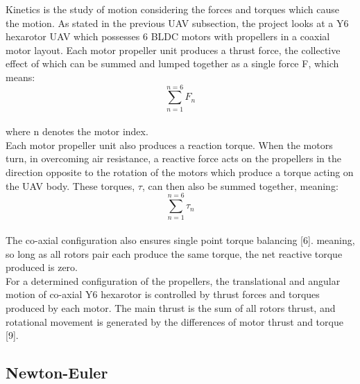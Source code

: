 \documentclass[12pt,a4paper,twoside]{report}
\begin{document}
				Kinetics is the study of motion considering the forces and torques which cause the motion. As stated in the previous UAV subsection, the project looks at a Y6 hexarotor UAV which possesses 6 BLDC motors with propellers in a coaxial motor layout. Each motor propeller unit produces a thrust force, the collective effect of which can be summed and lumped together as a single force F, which means:
				\\
				\[\sum_{n = 1}^{n = 6}F_n\]
				\\
				where n denotes the motor index.
				\\
				Each motor propeller unit also produces a reaction torque. When the motors turn, in overcoming air resistance, a reactive force acts on the propellers in the direction opposite to the rotation of the motors which produce a torque acting on the UAV body. These torques, $\tau$, can then also be summed together, meaning:
				\\
				\[\sum_{n = 1}^{n = 6}\tau_n\] 
				\\
				The co-axial configuration also ensures single point torque balancing [6]. meaning, so long as all rotors pair each produce the same torque, the net reactive torque produced is zero.
				\\
				For a determined configuration of the propellers, the translational and angular motion of co-axial Y6 hexarotor is controlled by thrust forces and torques produced by each motor. The main thrust is the sum of all rotors thrust, and rotational movement is generated by the differences of motor thrust and torque [9].
				
				\subsection*{Newton-Euler}
				
\end{document}
